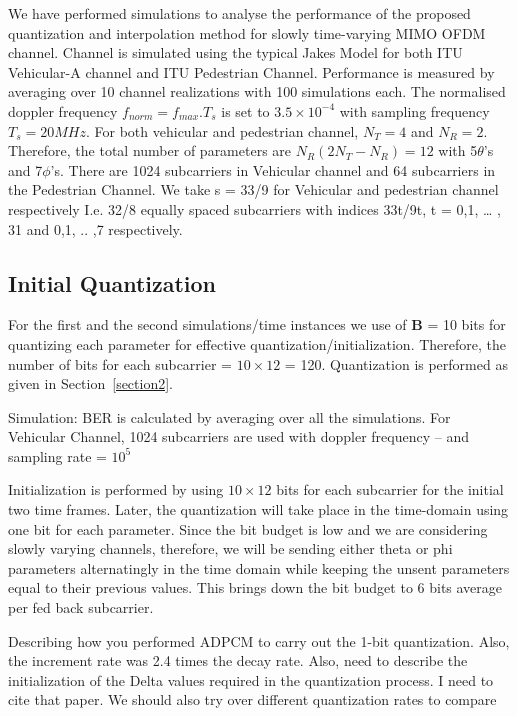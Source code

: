\documentclass[conference]{IEEEtran}
\begin{document}
 We have performed simulations to analyse the performance of the proposed quantization and interpolation method for slowly time-varying MIMO OFDM channel. Channel is simulated using the typical Jakes Model for both ITU Vehicular-A channel and ITU Pedestrian Channel. Performance is measured by averaging over 10 channel realizations with 100 simulations each. The normalised doppler frequency $f_{norm} = f_{max}.T_s$ is set to $3.5\times10^{-4}$ with sampling frequency $T_s = 20MHz$. For both vehicular and pedestrian channel, $N_T=4$ and $N_R=2$. Therefore, the total number of parameters are $N_{R}(2N_{T} - N_{R}) = 12$ with 5$\theta$’s and 7$\phi$’s. There are 1024 subcarriers in Vehicular channel and 64 subcarriers in the Pedestrian Channel. We take s = 33/9 for Vehicular and pedestrian channel respectively I.e. 32/8 equally spaced subcarriers with indices 33t/9t, t = 0,1, … , 31 and 0,1, .. ,7 respectively.  

\subsection{Initial Quantization} 
For the first and the second simulations/time instances we use of $\textbf{B}$ = 10 bits for quantizing each parameter for effective quantization/initialization. Therefore, the number of bits for each subcarrier = $10\times12$ = 120. Quantization is performed as given in Section~\ref{section2}. 

Simulation: BER is calculated by averaging over all the simulations. For Vehicular Channel, 1024 subcarriers are used with doppler frequency – and sampling rate = $10^{5}$

Initialization is performed by using $10\times12$ bits for each subcarrier for the initial two time frames. Later, the quantization will take place in the time-domain using one bit for each parameter. Since the bit budget is low and we are considering slowly varying channels, therefore, we will be sending either theta or phi parameters alternatingly in the time domain while keeping the unsent parameters equal to their previous values. This brings down the bit budget to 6 bits average per fed back subcarrier. 

Describing how you performed ADPCM to carry out the 1-bit quantization. Also, the increment rate was 2.4 times the decay rate. Also, need to describe the initialization of the Delta values required in the quantization process. I need to cite that paper. We should also try over different quantization rates to compare \cite{Gupt1905:Predictive} 
\end{document}
